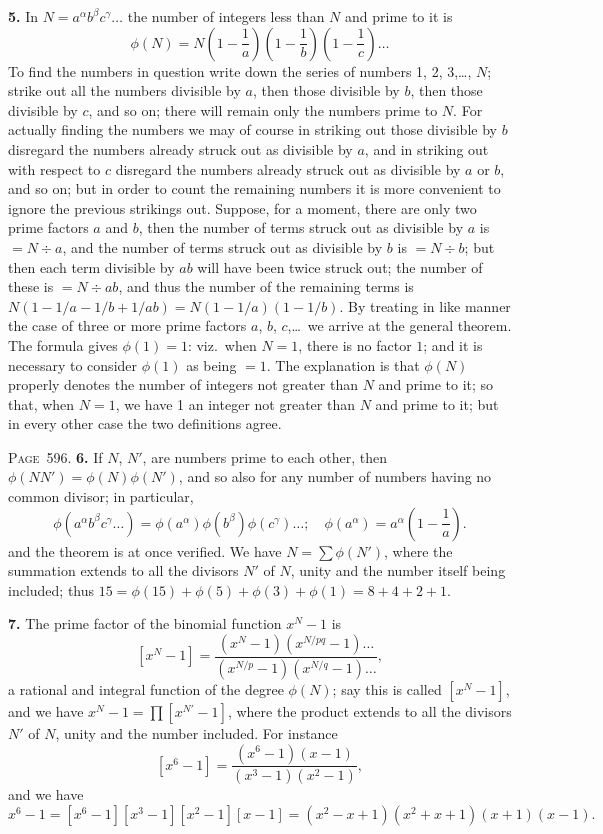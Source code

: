 \documentclass[11pt,a4paper]{article}
\theoremstyle{definition}
\begin{document}
\textbf{5.} In $N=a^\alpha b^\beta c^\gamma\ldots$ the number of integers less than $N$ and prime to it is
\[
\phi(N)=N\left(1-\frac{1}{a}\right)\left(1-\frac{1}{b}\right)\left(1-\frac{1}{c}\right)\ldots
\]
To find the numbers in question write down the series of numbers 1, 2, 3,\ldots, $N$; strike out all the numbers divisible by $a$, then those divisible by $b$, then those divisible by $c$, and so on; there will remain only the numbers prime to $N$. For actually finding the numbers we may of course in striking out those divisible by $b$ disregard the numbers already struck out as divisible by $a$, and in striking out with respect to $c$ disregard the numbers already struck out as divisible by $a$ or $b$, and so on; but in order to count the remaining numbers it is more convenient to ignore the previous strikings out. Suppose, for a moment, there are only two prime factors $a$ and $b$, then the number of terms struck out as divisible by $a$ is $=N\div a$, and the number of terms struck out as divisible by $b$ is $=N\div b$; but then each term divisible by $ab$ will have been twice struck out; the number of these is $=N\div ab$, and thus the number of the remaining terms is $N(1-1/a-1/b+1/ab)=N(1-1/a)(1-1/b)$. By treating in like manner the case of three or more prime factors $a$, $b$, $c$,\ldots\ we arrive at the general theorem. The formula gives $\phi(1)=1$: viz.\ when $N=1$, there is no factor $1$; and it is necessary to consider $\phi(1)$ as being $=1$. The explanation is that $\phi(N)$ properly denotes the number of integers not greater than $N$ and prime to it; so that, when $N=1$, we have 1 an integer not greater than $N$ and prime to it; but in every other case the two definitions agree.

\newpage
\noindent\textsc{Page~596.} \textbf{6.} If $N$, $N'$, are numbers prime to each other, then $\phi(NN')=\phi(N)\phi(N')$, and so also for any number of numbers having no common divisor; in particular,
\[
\phi(a^\alpha b^\beta c^\gamma\ldots)=\phi(a^\alpha)\phi(b^\beta)\phi(c^\gamma)\ldots;\quad
\phi(a^\alpha)=a^\alpha\left(1-\frac{1}{a}\right).
\]
and the theorem is at once verified. We have $N=\sum\phi(N')$, where the summation extends to all the divisors $N'$ of $N$, unity and the number itself being included; thus $15=\phi(15)+\phi(5)+\phi(3)+\phi(1)=8+4+2+1$.

\textbf{7.} The prime factor of the binomial function $x^N-1$ is
\[
[x^N-1]=\frac{(x^N-1)(x^{N/pq}-1)\ldots}{(x^{N/p}-1)(x^{N/q}-1)\ldots},
\]
a rational and integral function of the degree $\phi(N)$; say this is called $[x^N-1]$, and we have $x^N-1=\prod[x^{N'}-1]$, where the product extends to all the divisors $N'$ of $N$, unity and the number included. For instance
\[
[x^6-1]=\frac{(x^6-1)(x-1)}{(x^3-1)(x^2-1)},
\]
and we have
\[
x^6-1=[x^6-1][x^3-1][x^2-1][x-1]=(x^2-x+1)(x^2+x+1)(x+1)(x-1).
\]
\end{document}
